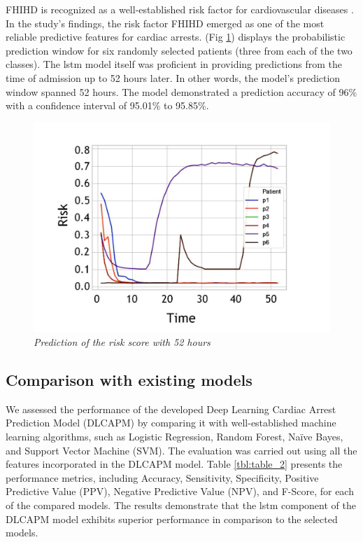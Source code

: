 \documentclass[journal,article,submit,pdftex,moreauthors]{Definitions/mdpi}
\begin{document}
FHIHD is recognized as a well-established risk factor for cardiovascular diseases \cite{b24}. In the study's findings, the risk factor FHIHD emerged as one of the most reliable predictive features for cardiac arrests. (Fig \ref{fig:figure7}) displays the probabilistic prediction window for six randomly selected patients (three from each of the two classes).
The \gls{lstm} model itself was proficient in providing predictions from the time of admission up to 52 hours later. In other words, the model's prediction window spanned 52 hours. The model demonstrated a prediction accuracy of 96\% with a confidence interval of 95.01\% to 95.85\%.

%
\begin{figure}[hbt!]
    \centering
    \includegraphics[width=0.75\linewidth]{images/riskPrediction.pdf}
    \caption{\textit{Prediction of the risk score with 52 hours}}
    \label{fig:figure7}
    \vspace{-10pt}
\end{figure}

\subsection{Comparison with existing models}
We assessed the performance of the developed Deep Learning Cardiac Arrest Prediction Model (DLCAPM) by comparing it with well-established machine learning algorithms, such as Logistic Regression, Random Forest, Naïve Bayes, and Support Vector Machine (SVM). The evaluation was carried out using all the features incorporated in the DLCAPM model. Table \ref{tbl:table_2} presents the performance metrics, including Accuracy, Sensitivity, Specificity, Positive Predictive Value (PPV), Negative Predictive Value (NPV), and F-Score, for each of the compared models. The results demonstrate that the \gls{lstm} component of the DLCAPM model exhibits superior performance in comparison to the selected models.

\end{document}
